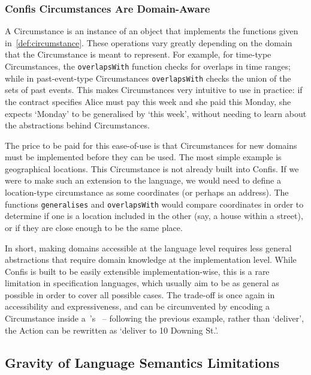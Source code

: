 \subsubsection{Confis Circumstances Are Domain-Aware}
\label{subsubsec:limits-domain-circumstances}

A Circumstance is an instance of an object that implements the functions given in~\autoref{def:circumstance}.
These operations vary greatly depending on the domain that the Circumstance is meant to represent.
For example, for time-type Circumstances, the \texttt{overlapsWith} function checks for overlaps in time ranges;
while in past-event-type Circumstances \texttt{overlapsWith} checks the union of the sets of past events.
This makes Circumstances very intuitive to use in practice: if the contract specifies Alice must pay this week and she paid this Monday, she expects `Monday' to be generalised by `this week', without needing to learn about the abstractions behind Circumstances.


The price to be paid for this ease-of-use is that Circumstances for new domains must be implemented before they can be used.
The most simple example is geographical locations.
This Circumstance is not already built into Confis.
If we were to make such an extension to the language, we would need to define a location-type circumstance as some coordinates (or perhaps an address).
The functions \texttt{generalises} and \texttt{overlapsWith} would compare coordinates in order to determine if one is a location included in the other (say, a house within a street), or if they are close enough to be the same place.

In short, making domains accessible at the language level requires less general abstractions that require domain knowledge at the implementation level.
While Confis is built to be easily extensible implementation-wise, this is a rare limitation in specification languages, which usually aim to be as general as possible in order to cover all possible cases.
The trade-off is once again in accessibility and expressiveness, and can be circumvented by encoding a Circumstance inside a~'s~ -- following the previous example, rather than `deliver', the Action can be rewritten as `deliver to 10 Downing St.'.

\subsection{Gravity of Language Semantics Limitations}\label{subsec:gravity--lang-limits}

